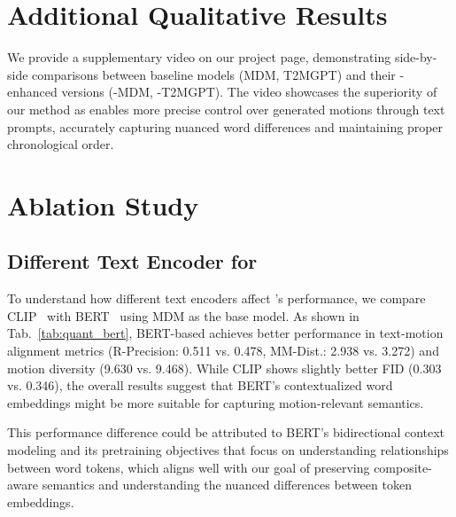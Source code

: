 \appendix
\onecolumn

\section{Additional Qualitative Results} \label{sup:add_qual_res}
We provide a supplementary video on our project page, demonstrating side-by-side comparisons between baseline models (MDM, T2MGPT) and their {\modulename}-enhanced versions ({\modulename}-MDM, {\modulename}-T2MGPT). 
The video showcases the superiority of our method as 
{\modulename} enables more precise control over generated motions through text prompts, accurately capturing nuanced word differences and maintaining proper chronological order.


\section{Ablation Study}

\subsection{Different Text Encoder for {\modulename}}
To understand how different text encoders affect {\modulename}'s performance, we compare CLIP~\cite{radford2021learning} with BERT~\cite{devlin2018bert} using MDM as the base model. 
As shown in Tab.~\ref{tab:quant_bert}, BERT-based {\modulename} achieves better performance in text-motion alignment metrics (R-Precision: 0.511 vs. 0.478, MM-Dist.: 2.938 vs. 3.272) and motion diversity (9.630 vs. 9.468). 
While CLIP shows slightly better FID (0.303 vs. 0.346), the overall results suggest that BERT's contextualized word embeddings might be more suitable for capturing motion-relevant semantics.

This performance difference could be attributed to BERT's bidirectional context modeling and its pretraining objectives that focus on understanding relationships between word tokens, which aligns well with our goal of preserving composite-aware semantics and understanding the nuanced differences between token embeddings.

